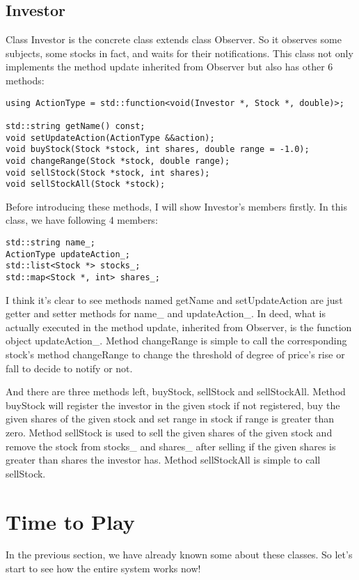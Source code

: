 \documentclass{article}
\begin{document}
\subsection{Investor}

    Class Investor is the concrete class extends class Observer. So it observes some subjects, some stocks in fact, and waits for their notifications. This class not only implements the method update inherited from Observer but also has other 6 methods:
    
\begin{lstlisting}
using ActionType = std::function<void(Investor *, Stock *, double)>;

std::string getName() const;
void setUpdateAction(ActionType &&action);
void buyStock(Stock *stock, int shares, double range = -1.0);
void changeRange(Stock *stock, double range);
void sellStock(Stock *stock, int shares);
void sellStockAll(Stock *stock);
\end{lstlisting}

    Before introducing these methods, I will show Investor's members firstly. In this class, we have following 4 members:
    
\begin{lstlisting}
std::string name_;
ActionType updateAction_;
std::list<Stock *> stocks_;
std::map<Stock *, int> shares_;
\end{lstlisting}

    I think it's clear to see methods named getName and setUpdateAction are just getter and setter methods for name\_ and updateAction\_. In deed, what is actually executed in the method update, inherited from Observer, is the function object updateAction\_. Method changeRange is simple to call the corresponding stock's method changeRange to change the threshold of degree of price's rise or fall to decide to notify or not.
    
    And there are three methods left, buyStock, sellStock and sellStockAll. Method buyStock will register the investor in the given stock if not registered, buy the given shares of the given stock and set range in stock if range is greater than zero. Method sellStock is used to sell the given shares of the given stock and remove the stock from stocks\_ and shares\_ after selling if the given shares is greater than shares the investor has. Method sellStockAll is simple to call sellStock.

\section{Time to Play}

    In the previous section, we have already known some about these classes. So let's start to see how the entire system works now!
\end{document}
